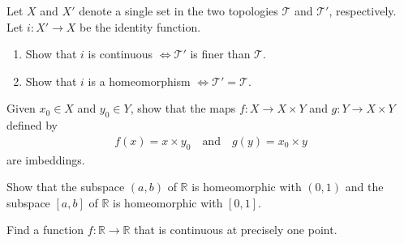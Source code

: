   \begin{exercise}[Munkres 18.3]
    Let $X$ and $X'$ denote a single set in the two topologies $\mathcal{T}$ and $\mathcal{T}'$, respectively. Let $i : X' \to X$ be the identity function.
    \begin{enumerate}
      \item Show that $i$ is continuous $\Leftrightarrow \mathcal{T}'$ is finer than $\mathcal{T}$.
      \item Show that $i$ is a homeomorphism $\Leftrightarrow \mathcal{T}' = \mathcal{T}$.
    \end{enumerate}
  \end{exercise}

  \begin{exercise}[Munkres 18.4]
    Given $x_0 \in X$ and $y_0 \in Y$, show that the maps $f : X \to X \times Y$ and $g : Y \to X \times Y$ defined by
    \begin{align*}
      f(x) = x \times y_0 \quad \text{and} \quad g(y) = x_0 \times y
    \end{align*}
    are imbeddings.
  \end{exercise}

  \begin{exercise}[Munkres 18.5]
    Show that the subspace $(a, b)$ of $\mathbb{R}$ is homeomorphic with $(0, 1)$ and the subspace $[a, b]$ of $\mathbb{R}$ is homeomorphic with $[0, 1]$.
  \end{exercise}

  \begin{exercise}[Munkres 18.6]
    Find a function $f : \mathbb{R} \to \mathbb{R}$ that is continuous at precisely one point.
  \end{exercise}

